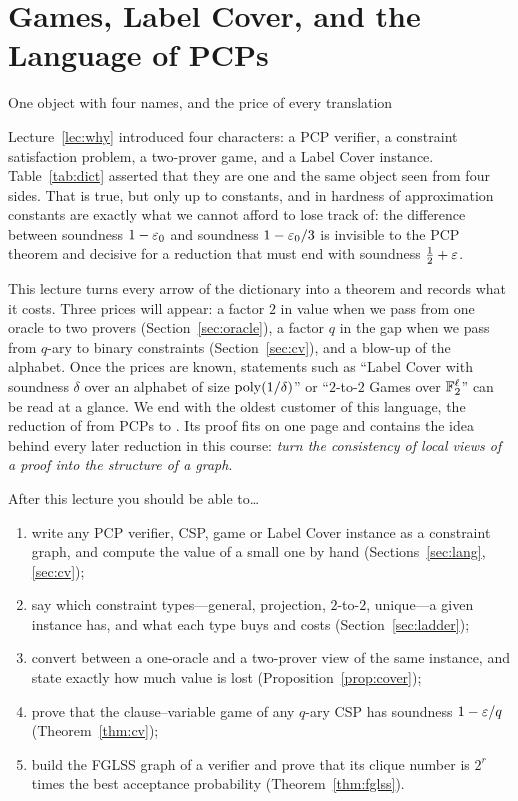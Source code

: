 \chapter{Games, Label Cover, and the Language of PCPs}
\label{lec:games}

{\sffamily\large\color{softgray}One object with four names, and the price of every translation\par}
\vspace{0.5em}

\noindent
Lecture~\ref{lec:why} introduced four characters: a PCP verifier, a constraint satisfaction
problem, a two-prover game, and a Label Cover instance.  Table~\ref{tab:dict} asserted that they are
one and the same object seen from four sides.  That is true, but only up to constants, and in hardness of
approximation constants are exactly what we cannot afford to lose track of: the difference between
soundness $1-\varepsilon_0$ and soundness $1-\varepsilon_0/3$ is invisible to the PCP theorem and decisive for a reduction
that must end with soundness $\tfrac12+\varepsilon$.

This lecture turns every arrow of the dictionary into a theorem and records what it costs.  Three prices
will appear: a factor $2$ in value when we pass from one oracle to two provers (Section~\ref{sec:oracle}), a
factor $q$ in the gap when we pass from $q$-ary to binary constraints (Section~\ref{sec:cv}), and a blow-up
of the alphabet.  Once the prices are known, statements such as ``Label Cover with soundness $\delta$ over
an alphabet of size $\operatorname{poly}(1/\delta)$'' or ``$2$-to-$2$ Games over $\mathbb{F}_2^\ell$'' can be read at a glance.
We end with the oldest customer of this language, the reduction of
\citet{FGLSS96} from PCPs to .  Its proof fits on one page and contains the idea behind
every later reduction in this course: \emph{turn the consistency of local views of a proof into the structure of a graph}.

\begin{goalbox}{After this lecture you should be able to\ldots}
\begin{enumerate}[leftmargin=*,label=(\arabic*)]
  \item write any PCP verifier, CSP, game or Label Cover instance as a constraint graph, and compute
        the value of a small one by hand (Sections~\ref{sec:lang}, \ref{sec:cv});
  \item say which constraint types---general, projection, $2$-to-$2$, unique---a given instance has, and
        what each type buys and costs (Section~\ref{sec:ladder});
  \item convert between a one-oracle and a two-prover view of the same instance, and state exactly how
        much value is lost (Proposition~\ref{prop:cover});
  \item prove that the clause--variable game of any $q$-ary CSP has soundness $1-\varepsilon/q$ (Theorem~\ref{thm:cv});
  \item build the FGLSS graph of a verifier and prove that its clique number is $2^r$ times the best
        acceptance probability (Theorem~\ref{thm:fglss}).
\end{enumerate}
\end{goalbox}


